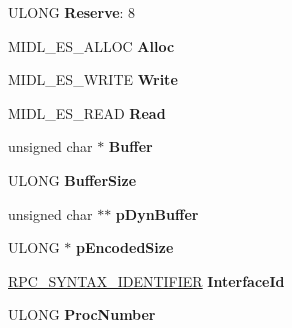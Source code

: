 \begin{DoxyCompactItemize}
U\+L\+O\+NG {\bfseries Reserve}\+: 8
\item 
\mbox{\label{struct___m_i_d_l___e_s___m_e_s_s_a_g_e_af9b099e6ec488245acb6f9409d6b66fe}} 
M\+I\+D\+L\+\_\+\+E\+S\+\_\+\+A\+L\+L\+OC {\bfseries Alloc}
\item 
\mbox{\label{struct___m_i_d_l___e_s___m_e_s_s_a_g_e_a10b491c3a36e533658c469401fd307e6}} 
M\+I\+D\+L\+\_\+\+E\+S\+\_\+\+W\+R\+I\+TE {\bfseries Write}
\item 
\mbox{\label{struct___m_i_d_l___e_s___m_e_s_s_a_g_e_acc820490a0c553e58fa7acbeb9c3f27a}} 
M\+I\+D\+L\+\_\+\+E\+S\+\_\+\+R\+E\+AD {\bfseries Read}
\item 
\mbox{\label{struct___m_i_d_l___e_s___m_e_s_s_a_g_e_a2b700a48bf02ebf58beb97bf97be23b8}} 
unsigned char $\ast$ {\bfseries Buffer}
\item 
\mbox{\label{struct___m_i_d_l___e_s___m_e_s_s_a_g_e_a9f8ec319e9ea9b65e623ede809b945c1}} 
U\+L\+O\+NG {\bfseries Buffer\+Size}
\item 
\mbox{\label{struct___m_i_d_l___e_s___m_e_s_s_a_g_e_a235c01f26ada260dc6c283f48edcded1}} 
unsigned char $\ast$$\ast$ {\bfseries p\+Dyn\+Buffer}
\item 
\mbox{\label{struct___m_i_d_l___e_s___m_e_s_s_a_g_e_a38e46b9ec23daf7fc26edc8d0ba50e29}} 
U\+L\+O\+NG $\ast$ {\bfseries p\+Encoded\+Size}
\item 
\mbox{\label{struct___m_i_d_l___e_s___m_e_s_s_a_g_e_ae5a134f1250d140b97a18738e5b55c2a}} 
\hyperlink{struct___r_p_c___s_y_n_t_a_x___i_d_e_n_t_i_f_i_e_r}{R\+P\+C\+\_\+\+S\+Y\+N\+T\+A\+X\+\_\+\+I\+D\+E\+N\+T\+I\+F\+I\+ER} {\bfseries Interface\+Id}
\item 
\mbox{\label{struct___m_i_d_l___e_s___m_e_s_s_a_g_e_a22ec41c1a8db42a8678a5b9d8cbce2bb}} 
U\+L\+O\+NG {\bfseries Proc\+Number}
\item 
$$
\end{DoxyCompactItemize}
